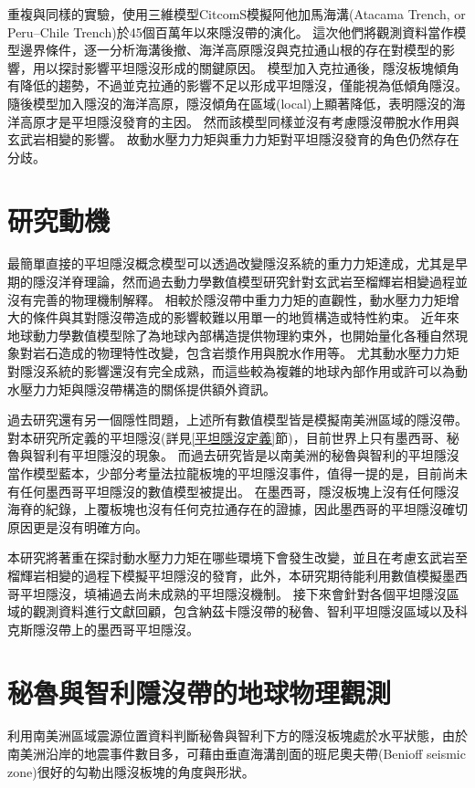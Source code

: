 \citealp{Hu2016}重複與\citealp{Manea2012Chile}同樣的實驗，使用三維模型CitcomS模擬阿他加馬海溝(Atacama Trench, or Peru–Chile Trench)於45個百萬年以來隱沒帶的演化。
這次他們將觀測資料當作模型邊界條件，逐一分析海溝後撤、海洋高原隱沒與克拉通山根的存在對模型的影響，用以探討影響平坦隱沒形成的關鍵原因。
模型加入克拉通後，隱沒板塊傾角有降低的趨勢，不過並克拉通的影響不足以形成平坦隱沒，僅能視為低傾角隱沒。
隨後模型加入隱沒的海洋高原，隱沒傾角在區域(local)上顯著降低，表明隱沒的海洋高原才是平坦隱沒發育的主因。
然而該模型同樣並沒有考慮隱沒帶脫水作用與玄武岩相變的影響。
故動水壓力力矩與重力力矩對平坦隱沒發育的角色仍然存在分歧。

\section{研究動機}\label{研究動機}
最簡單直接的平坦隱沒概念模型可以透過改變隱沒系統的重力力矩達成，尤其是早期的隱沒洋脊理論，然而過去動力學數值模型研究針對玄武岩至榴輝岩相變過程並沒有完善的物理機制解釋。
相較於隱沒帶中重力力矩的直觀性，動水壓力力矩增大的條件與其對隱沒帶造成的影響較難以用單一的地質構造或特性約束。
近年來地球動力學數值模型除了為地球內部構造提供物理約束外，也開始量化各種自然現象對岩石造成的物理特性改變，包含岩漿作用與脫水作用等。
尤其動水壓力力矩對隱沒系統的影響還沒有完全成熟，而這些較為複雜的地球內部作用或許可以為動水壓力力矩與隱沒帶構造的關係提供額外資訊。

過去研究還有另一個隱性問題，上述所有數值模型皆是模擬南美洲區域的隱沒帶。
對本研究所定義的平坦隱沒(詳見\ref{平坦隱沒定義}節)，目前世界上只有墨西哥、秘魯與智利有平坦隱沒的現象。
而過去研究皆是以南美洲的秘魯與智利的平坦隱沒當作模型藍本，少部分考量法拉龍板塊的平坦隱沒事件，值得一提的是，目前尚未有任何墨西哥平坦隱沒的數值模型被提出。
在墨西哥，隱沒板塊上沒有任何隱沒海脊的紀錄，上覆板塊也沒有任何克拉通存在的證據，因此墨西哥的平坦隱沒確切原因更是沒有明確方向。

本研究將著重在探討動水壓力力矩在哪些環境下會發生改變，並且在考慮玄武岩至榴輝岩相變的過程下模擬平坦隱沒的發育，此外，本研究期待能利用數值模擬墨西哥平坦隱沒，填補過去尚未成熟的平坦隱沒機制。
接下來會針對各個平坦隱沒區域的觀測資料進行文獻回顧，包含納茲卡隱沒帶的秘魯、智利平坦隱沒區域以及科克斯隱沒帶上的墨西哥平坦隱沒。


\section{秘魯與智利隱沒帶的地球物理觀測}\label{秘魯與智利隱沒帶地球物理觀測}
\citealp{barazangi1976}利用南美洲區域震源位置資料判斷秘魯與智利下方的隱沒板塊處於水平狀態，由於南美洲沿岸的地震事件數目多，可藉由垂直海溝剖面的班尼奧夫帶(Benioff seismic zone)很好的勾勒出隱沒板塊的角度與形狀。


